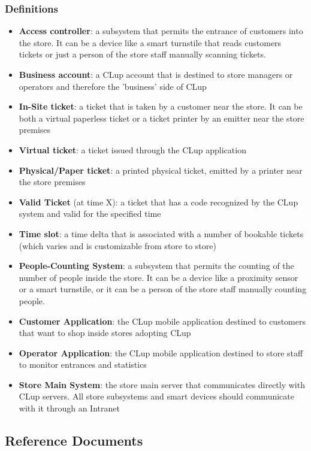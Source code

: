 \subsubsection{Definitions}
\begin{itemize}
      \item \textbf{Access controller}: a subsystem that permits the entrance of customers into the store. It can be a device like a smart turnstile that reads customers tickets or just a person of the store staff manually scanning tickets.
      \item \textbf{Business account}: a CLup account that is destined to store managers or operators and therefore the 'business' side of CLup
      \item \textbf{In-Site ticket}: a ticket that is taken by a customer near the store. It can be both a virtual paperless ticket or a ticket printer by an emitter near the store premises
      \item \textbf{Virtual ticket}: a ticket issued through the CLup application
      \item \textbf{Physical/Paper ticket}: a printed physical ticket, emitted by a printer near the store premises
      \item \textbf{Valid Ticket} (at time X): a ticket that has a code recognized by the CLup system and valid for the specified time
      \item \textbf{Time slot}: a time delta that is associated with a number of bookable tickets (which varies and is customizable from store to store)
      \item \textbf{People-Counting System}: a subsystem that permits the counting of the number of people inside the store. It can be a device like a proximity sensor or a smart turnstile, or it can be a person of the store staff manually counting people.
      \item \textbf{Customer Application}: the CLup mobile application destined to customers that want to shop inside stores adopting CLup
      \item \textbf{Operator Application}: the CLup mobile application destined to store staff to monitor entrances and statistics
      \item \textbf{Store Main System}: the store main server that communicates directly with CLup servers. All store subsystems and smart devices should communicate with it through an Intranet
\end{itemize}

\subsection{Reference Documents}

